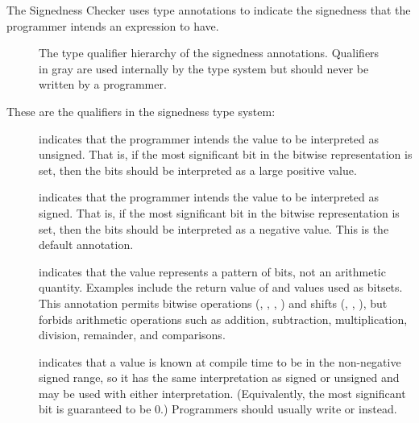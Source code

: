 The Signedness Checker uses type annotations to indicate the signedness that the programmer intends an expression to have.

\begin{figure}
\caption{The type qualifier hierarchy of the signedness annotations.
Qualifiers in gray are used internally by the type system but should never be written by a programmer.}
\label{fig-signedness-hierarchy}
\end{figure}

These are the qualifiers in the signedness type system:

\begin{description}

\item[]
    indicates that the programmer intends the value to be
    interpreted as unsigned.
    That is, if the most significant bit in the bitwise representation is
    set, then the bits should be interpreted as a large positive value.

\item[]
    indicates that the programmer intends the value to be
    interpreted as signed.
    That is, if the most significant bit in the bitwise representation is
    set, then the bits should be interpreted as a negative value.
    This is the default annotation.

\item[]
    indicates that the value represents a pattern of bits, not an arithmetic
    quantity. Examples include the return value of 
    and values used as bitsets. This annotation permits bitwise operations
    (\code{\&}, \code{|}, \code{\^}, \code{\~{}}) and shifts
    (\code{<<}, \code{>>}, \code{>>>}), but forbids arithmetic operations such as
    addition, subtraction, multiplication, division, remainder, and comparisons.

\item[]
    indicates that a value is known at compile time to be in the non-negative
    signed range, so it has the same interpretation as signed or unsigned
    and may be used with either interpretation.  (Equivalently, the most
    significant bit is guaranteed to be 0.)  Programmers should usually
    write  or
     instead.


\end{description}

